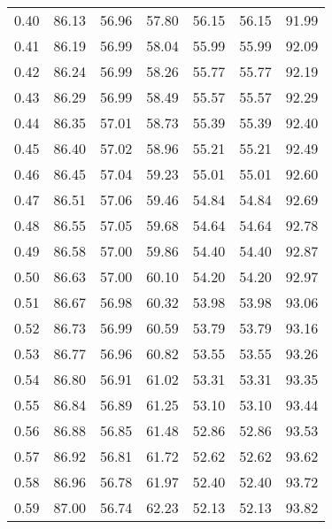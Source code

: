\begin{tabular}{|c|c|c|c|c|c|c|}
      0.40 &     86.13 &     56.96 &      57.80 &   56.15 &      56.15 &         91.99 \\
      0.41 &     86.19 &     56.99 &      58.04 &   55.99 &      55.99 &         92.09 \\
      0.42 &     86.24 &     56.99 &      58.26 &   55.77 &      55.77 &         92.19 \\
      0.43 &     86.29 &     56.99 &      58.49 &   55.57 &      55.57 &         92.29 \\
      0.44 &     86.35 &     57.01 &      58.73 &   55.39 &      55.39 &         92.40 \\
      0.45 &     86.40 &     57.02 &      58.96 &   55.21 &      55.21 &         92.49 \\
      0.46 &     86.45 &     57.04 &      59.23 &   55.01 &      55.01 &         92.60 \\
      0.47 &     86.51 &     57.06 &      59.46 &   54.84 &      54.84 &         92.69 \\
      0.48 &     86.55 &     57.05 &      59.68 &   54.64 &      54.64 &         92.78 \\
      0.49 &     86.58 &     57.00 &      59.86 &   54.40 &      54.40 &         92.87 \\
      0.50 &     86.63 &     57.00 &      60.10 &   54.20 &      54.20 &         92.97 \\
      0.51 &     86.67 &     56.98 &      60.32 &   53.98 &      53.98 &         93.06 \\
      0.52 &     86.73 &     56.99 &      60.59 &   53.79 &      53.79 &         93.16 \\
      0.53 &     86.77 &     56.96 &      60.82 &   53.55 &      53.55 &         93.26 \\
      0.54 &     86.80 &     56.91 &      61.02 &   53.31 &      53.31 &         93.35 \\
      0.55 &     86.84 &     56.89 &      61.25 &   53.10 &      53.10 &         93.44 \\
      0.56 &     86.88 &     56.85 &      61.48 &   52.86 &      52.86 &         93.53 \\
      0.57 &     86.92 &     56.81 &      61.72 &   52.62 &      52.62 &         93.62 \\
      0.58 &     86.96 &     56.78 &      61.97 &   52.40 &      52.40 &         93.72 \\
      0.59 &     87.00 &     56.74 &      62.23 &   52.13 &      52.13 &         93.82 \\

\end{tabular}
